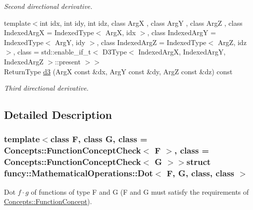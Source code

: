 \begin{DoxyCompactItemize}
\begin{DoxyCompactList}\small\item\em Second directional derivative. \end{DoxyCompactList}\item 
{\footnotesize template$<$int idx, int idy, int idz, class Arg\-X , class Arg\-Y , class Arg\-Z , class Indexed\-Arg\-X  = Indexed\-Type$<$ Arg\-X, idx $>$, class Indexed\-Arg\-Y  = Indexed\-Type$<$ Arg\-Y, idy $>$, class Indexed\-Arg\-Z  = Indexed\-Type$<$ Arg\-Z, idz $>$, class  = std\-::enable\-\_\-if\-\_\-t$<$                           D3\-Type$<$ Indexed\-Arg\-X, Indexed\-Arg\-Y, Indexed\-Arg\-Z $>$\-::present $>$$>$ }\\Return\-Type \hyperlink{structfuncy_1_1MathematicalOperations_1_1Dot_a90e392bd0326f64a22483c4785270549}{d3} (Arg\-X const \&dx, Arg\-Y const \&dy, Arg\-Z const \&dz) const 
\begin{DoxyCompactList}\small\item\em Third directional derivative. \end{DoxyCompactList}\end{DoxyCompactItemize}


\subsection{Detailed Description}
\subsubsection*{template$<$class F, class G, class = Concepts\-::\-Function\-Concept\-Check$<$ F $>$, class = Concepts\-::\-Function\-Concept\-Check$<$ G $>$$>$struct funcy\-::\-Mathematical\-Operations\-::\-Dot$<$ F, G, class, class $>$}

Dot $f \cdot g$ of functions of type F and G (F and G must satisfy the requirements of \hyperlink{structfuncy_1_1Concepts_1_1FunctionConcept}{Concepts\-::\-Function\-Concept}). 

